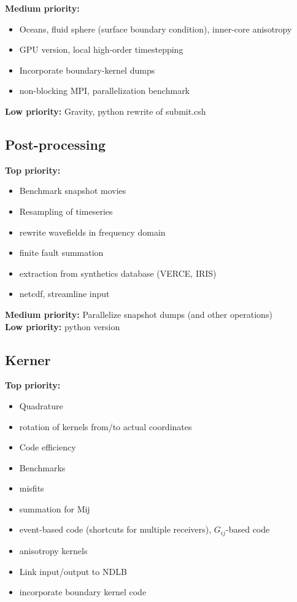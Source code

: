\documentclass[11pt,letter,fleqn,english,notitlepage]{article}
\begin{document}
\noindent\textbf{Medium priority:}
\begin{itemize}
\item Oceans, fluid sphere (surface boundary condition),
  inner-core anisotropy
\item GPU version, local high-order timestepping
\item Incorporate boundary-kernel dumps
\item non-blocking MPI, parallelization benchmark

\end{itemize}

\noindent\textbf{Low priority:}
Gravity, python rewrite of submit.csh

\subsection{Post-processing}
\noindent\textbf{Top priority:} 
\begin{itemize}
\item Benchmark snapshot movies
\item Resampling of timeseries
\item rewrite wavefields in frequency domain
\item finite fault summation
\item extraction from synthetics database (VERCE, IRIS)
\item netcdf, streamline input
\end{itemize}

\noindent\textbf{Medium priority:}
Parallelize snapshot dumps (and other operations)\\

\noindent\textbf{Low priority:} python version

\subsection{Kerner}
\noindent\textbf{Top priority:} 
\begin{itemize}
\item Quadrature
\item rotation of kernels from/to actual coordinates
\item Code efficiency
\item Benchmarks
\item misfits
\item summation for Mij
\item event-based code (shortcuts for multiple receivers), $G_{ij}$-based code
\item anisotropy kernels
\item Link input/output to NDLB
\item incorporate boundary kernel code
\end{itemize}
\end{document}
